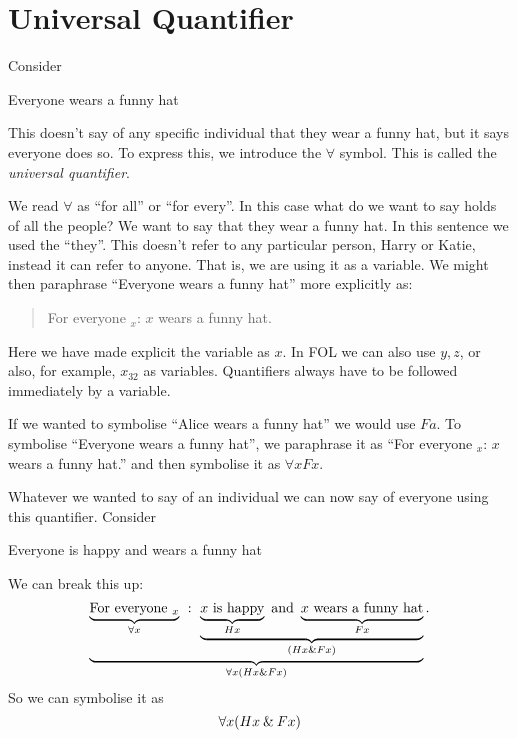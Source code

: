 \section{Universal Quantifier}

Consider
\begin{earg}
\item[\ex{q.hat}] Everyone wears a funny hat
\end{earg}
This doesn't say of any specific individual that they wear a funny hat, but it says everyone does so. To express this, we introduce the $\forall$ symbol. This is called the \emph{universal quantifier}.



We read $\forall$ as ``for all'' or ``for every''. In this case what do we want to say holds of all the people? We want to say that they wear a funny hat. In this sentence we used the ``they''. This doesn't refer to any particular person, Harry or Katie, instead it can refer to anyone. That is, we are using it as a variable.
We might then paraphrase ``Everyone wears a funny hat'' more explicitly as:
\begin{quotation}
For everyone $_x$: $x$ wears a funny hat.
\end{quotation}

Here we have made explicit the variable as $x$. In FOL we can also use $y,z$, or also, for example, $x_{32}$ as variables. Quantifiers always have to be followed immediately by a variable.


If we wanted to symbolise ``Alice wears a funny hat'' we would use $Fa$. To symbolise ``Everyone wears a funny hat'', we paraphrase it as ``For everyone $_x$: $x$ wears a funny hat.'' and then symbolise it as $\forall x Fx$.


Whatever we wanted to say of an individual we can now say of everyone using this quantifier.  Consider
\begin{earg}
\item[\ex{q.hat}] Everyone is happy and wears a funny hat
\end{earg}
We can break this up:
\begin{equation*}
\underbrace{\underbrace{\text{For everyone $_x$}}_{\forall x}\ :\
 \underbrace{\underbrace{\text{$x$ is happy}}_{Hx}\text{ and }
 \underbrace{\text{$x$ wears a funny hat}}_{Fx}}_{(Hx\mathbin{\&} Fx)}}_{\forall x(Hx\mathbin{\&} Fx)}.
\end{equation*}
So we can symbolise it as $$\forall x(Hx\mathbin{\&} Fx)$$

